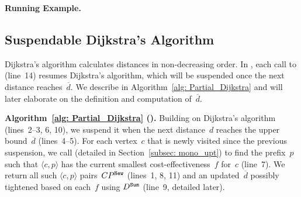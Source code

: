 \textbf{Running Example.}

\subsection{Suspendable Dijkstra's Algorithm}
\label{subsec: sec_dub}

Dijkstra's algorithm calculates distances in non-decreasing order. In \Improved, each call to \PartialDijkstra (line~14) resumes Dijkstra's algorithm, which will be suspended once the next distance reaches~$\overline{d}$. We describe \PartialDijkstra in Algorithm~\ref{alg: Partial_Dijkstra} and will later elaborate on the definition and computation of~$\overline{d}$.

\textbf{Algorithm~\ref{alg: Partial_Dijkstra} (\PartialDijkstra).}
Building on Dijkstra's algorithm (lines~2--3, 6, 10), we suspend it when the next distance~$d$ reaches the upper bound~\(\overline{d}\) (lines~4--5). For each vertex~$c$ that is newly visited since the previous suspension, we call \UpdateCandidate (detailed in Section~\ref{subsec: mono_upt}) to find the prefix~$p$ such that $\langle c,p \rangle$ has the current smallest cost-effectiveness~$f$ for~$c$ (line~7). We return all such $\langle c,p \rangle$ pairs~$CP^\mathtt{New}$ (lines~1, 8, 11) and an updated~\(\overline{d}\) possibly tightened based on each~$f$ using $D^{\texttt{Sum}}$ (line~9, detailed later).


